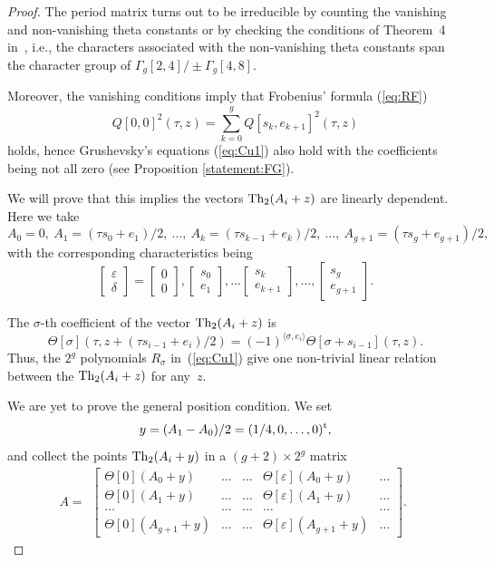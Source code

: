 \documentclass[pdftex]{sigma}
\numberwithin{equation}{section}
\newcommand{\de}{\delta}
\newcommand{\ep}{\varepsilon}
\def\s{\sigma}
\def\T{\Theta}
\begin{document}
\begin{proof}The period matrix turns out to be irreducible by counting the vanishing and non-vanishing theta constants or by checking the conditions of Theorem~4 in~\cite{SM}, i.e., the characters associated with the non-vanishing theta constants span the character group of
 $\Gamma_g[2,4]/\pm \Gamma_g[4,8]$.

Moreover, the vanishing conditions imply that Frobenius' formula (\ref{eq:RF})
\[
 Q[0, 0]^2 (\tau, z)=\sum_{k=0}^g Q[s_k, e_{k+1}]^2(\tau, z)
\]
 holds, hence Grushevsky's equations
 (\ref{eq:Cu1}) also hold with the coefficients being not all zero (see Proposition \ref{statement:FG}).

 We will prove that this implies the vectors ${\rm Th}_2(A_i + z) $ are linearly dependent.
 Here we take
 \[
A_0=0, \ A_1=(\tau s_0 + e_1)/2, \ \dots, \ A_k= (\tau s_{k-1} + e_k)/2, \ \dots, \ A_{g+1}= (\tau s_{g} + e_{g+1})/2,
\]
 with the corresponding characteristics being
\[
\begin{bmatrix} \ep \\ \de\end{bmatrix} =\begin{bmatrix} 0 \\ 0 \end{bmatrix} ,\begin{bmatrix} s_0 \\ e_{1}\end{bmatrix}, \dots\begin{bmatrix} s_k \\ e_{k+1} \end{bmatrix},\dots,\begin{bmatrix} s_g \\ e_{g+1} \end{bmatrix}.
\]

The $\s$-th coefficient of the vector ${\rm Th}_2(A_i + z)$ is
\[
\T[\s](\tau, z+(\tau s_{i-1} + e_i)/2)= (-1)^{\langle \s, e_i\rangle}\T[\s+s_{i-1}](\tau, z).
\]
Thus, the $2^g$ polynomials $R_\s$ in~(\ref{eq:Cu1}) give one non-trivial linear relation between the ${\rm Th}_2(A_i + z)$ for any~$z$.

We are yet to prove the general position condition. We set
\[
y=(A_1-A_0)/2= (1/4,0,\dots , 0)^{\rm t},
\]
and collect the points ${\rm Th}_2(A_i+y)$ in a $(g+2)\times 2^g$ matrix
\[
A=
 \begin{array}{ccccc}
 \begin{bmatrix} \T[0](A_0+y)&\dots&\dots& \T[\ep] (A_0+y)&\dots\\
\T[0](A_1+y)&\dots&\dots& \T[\ep] (A_1+y)&\dots\\
\dots&\dots&\dots&\dots&\dots\\
\T[0](A_{g+1}+y)&\dots&\dots& \T[\ep] (A_{g+1}+y)&\dots
 \end{bmatrix}.
 \end{array}
\]


\end{proof}
\end{document}
